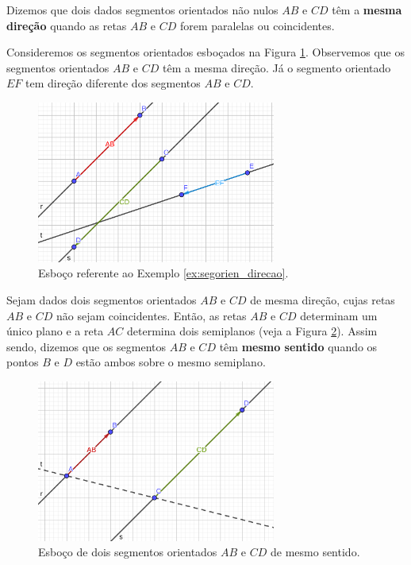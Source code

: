 Dizemos que dois dados segmentos orientados não nulos $AB$ e $CD$ têm a {\bf mesma direção} quando as retas $AB$ e $CD$ forem paralelas ou coincidentes.

\begin{ex}\label{ex:segorien_direcao}
  Consideremos os segmentos orientados esboçados na Figura \ref{fig:ex_segorien_direcao}. Observemos que os segmentos orientados $AB$ e $CD$ têm a mesma direção. Já o segmento orientado $EF$ tem direção diferente dos segmentos $AB$ e $CD$.
  
  \begin{figure}[h!]
    \centering
    \includegraphics[width=0.7\textwidth]{./cap_vetor/dados/fig_ex_segorien_direcao/fig_ex_segorien_direcao}
  \caption{Esboço referente ao Exemplo \ref{ex:segorien_direcao}.}
  \label{fig:ex_segorien_direcao}
\end{figure}  
\end{ex}

Sejam dados dois segmentos orientados $AB$ e $CD$ de mesma direção, cujas retas $AB$ e $CD$ não sejam coincidentes. Então, as retas $AB$ e $CD$ determinam um único plano e a reta $AC$ determina dois semiplanos (veja a Figura \ref{fig:segorien_sentido}). Assim sendo, dizemos que os segmentos $AB$ e $CD$ têm {\bf mesmo sentido} quando os pontos $B$ e $D$ estão ambos sobre o mesmo semiplano.

\begin{figure}[h!]
  \centering
  \includegraphics[width=0.7\textwidth]{./cap_vetor/dados/fig_segorien_sentido/fig_segorien_sentido}
  \caption{Esboço de dois segmentos orientados $AB$ e $CD$ de mesmo sentido.}
  \label{fig:segorien_sentido}
\end{figure}

